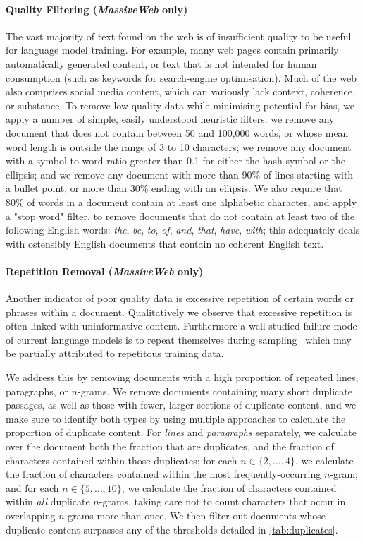\documentclass[11pt, a4paper, logo, internal, copyright, nonumbering]{deepmind}
\newcommand{\massiveweb}{\textit{MassiveWeb}\xspace}
\begin{document}
\paragraph{Quality Filtering (\massiveweb only)} The vast majority of text found on the web is of insufficient quality to be useful for language model training. For example, many web pages contain primarily automatically generated content, or text that is not intended for human consumption (such as keywords for search-engine optimisation). Much of the web also comprises social media content, which can variously lack context, coherence, or substance. To remove low-quality data while minimising potential for bias, we apply a number of simple, easily understood heuristic filters: we remove any document that does not contain between 50 and 100,000 words, or whose mean word length is outside the range of 3 to 10 characters; we remove any document with a symbol-to-word ratio greater than 0.1 for either the hash symbol or the ellipsis; and we remove any document with more than 90\% of lines starting with a bullet point, or more than 30\% ending with an ellipsis. We also require that 80\% of words in a document contain at least one alphabetic character, and apply a "stop word" filter, to remove documents that do not contain at least two of the following English words: \textit{the}, \textit{be}, \textit{to}, \textit{of}, \textit{and}, \textit{that}, \textit{have}, \textit{with}; this adequately deals with ostensibly English documents that contain no coherent English text.

\paragraph{Repetition Removal (\massiveweb only)} Another indicator of poor quality data is excessive repetition of certain words or phrases within a document. Qualitatively we observe that excessive repetition is often linked with uninformative content. Furthermore a well-studied failure mode of current language models is to repeat themselves during sampling~\citep{holtzman2019curious} which may be partially attributed to repetitous training data.

We address this by removing documents with a high proportion of repeated lines, paragraphs, or $n$-grams. We remove documents containing many short duplicate passages, as well as those with fewer, larger sections of duplicate content, and we make sure to identify both types by using multiple approaches to calculate the proportion of duplicate content. For \textit{lines} and \textit{paragraphs} separately, we calculate over the document both the fraction that are duplicates, and the fraction of characters contained within those duplicates; for each $n\in \{2,\ldots,4\}$, we calculate the fraction of characters contained within the most frequently-occurring $n$-gram; and for each $n\in \{5,\ldots,10\}$, we calculate the fraction of characters contained within \textit{all} duplicate $n$-grams, taking care not to count characters that occur in overlapping $n$-grams more than once. We then filter out documents whose duplicate content surpasses any of the thresholds detailed in \autoref{tab:duplicates}. 
\end{document}
